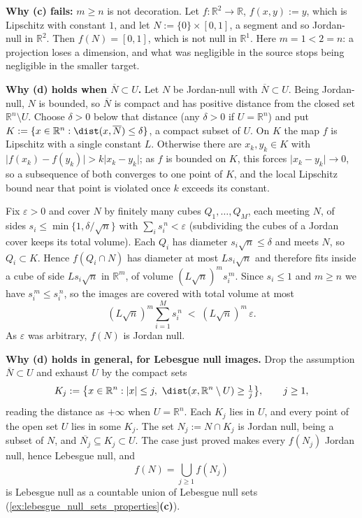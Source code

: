 \begin{exercisesolution}
\textbf{Why (c) fails:} $m \geq n$ is not decoration. Let $f : \mathbb{R}^2 \to \mathbb{R}$,
$f(x,y) := y$, which is Lipschitz with constant $1$, and let
$N := \{0\}\times[0,1]$, a segment and so Jordan-null in $\mathbb{R}^2$. Then $f(N) = [0,1]$,
which is not null in $\mathbb{R}^1$. Here $m = 1 < 2 = n$: a projection loses a dimension, and
what was negligible in the source stops being negligible in the smaller target.

\textbf{Why (d) holds when $\overline N \subset U$.} Let $N$ be Jordan-null with
$\overline N \subset U$. Being Jordan-null, $N$ is bounded, so $\overline N$ is compact and has
positive distance from the closed set $\mathbb{R}^n \setminus U$. Choose $\delta > 0$ below that
distance (any $\delta > 0$ if $U = \mathbb{R}^n$) and put
$K := \{x \in \mathbb{R}^n : \dist(x,\overline N) \leq \delta\}$, a compact subset of $U$. On $K$
the map $f$ is Lipschitz with a single constant $L$. Otherwise there are $x_k, y_k \in K$ with
$\lvert f(x_k) - f(y_k)\rvert > k\lvert x_k - y_k\rvert$; as $f$ is bounded on $K$, this forces
$\lvert x_k - y_k\rvert \to 0$, so a subsequence of both converges to one point of $K$, and the
local Lipschitz bound near that point is violated once $k$ exceeds its constant.

Fix $\varepsilon > 0$ and cover $N$ by finitely many cubes $Q_1,\dots,Q_M$, each meeting $N$, of
sides $s_i \leq \min\{1,\delta/\sqrt n\}$ with $\sum_i s_i^{\,n} < \varepsilon$ (subdividing the
cubes of a Jordan cover keeps its total volume). Each $Q_i$ has diameter
$s_i\sqrt n \leq \delta$ and meets $N$, so $Q_i \subset K$. Hence $f(Q_i \cap N)$ has diameter at
most $L s_i\sqrt n$ and therefore fits inside a cube of side $L s_i \sqrt n$ in $\mathbb{R}^m$, of
volume $(L\sqrt n)^m s_i^{\,m}$. Since $s_i \leq 1$ and $m \geq n$ we have
$s_i^{\,m} \leq s_i^{\,n}$, so the images are covered with total volume at most
\[(L\sqrt n)^m \sum_{i=1}^M s_i^{\,n} \;<\; (L\sqrt n)^m\,\varepsilon.\]
As $\varepsilon$ was arbitrary, $f(N)$ is Jordan null.

\textbf{Why (d) holds in general, for Lebesgue null images.} Drop the assumption
$\overline N \subset U$ and exhaust $U$ by the compact sets
\[K_j := \big\{x \in \mathbb{R}^n : \lvert x\rvert \leq j,\ \dist(x,\mathbb{R}^n\setminus U) \geq
  \tfrac1j\big\}, \qquad j \geq 1,\]
reading the distance as $+\infty$ when $U = \mathbb{R}^n$. Each $K_j$ lies in $U$, and every point
of the open set $U$ lies in some $K_j$. The set $N_j := N \cap K_j$ is Jordan null, being a subset
of $N$, and $\overline{N_j} \subseteq K_j \subset U$. The case just proved makes every $f(N_j)$
Jordan null, hence Lebesgue null, and
\[f(N) = \bigcup_{j\geq1} f(N_j)\]
is Lebesgue null as a countable union of Lebesgue null sets
(\cref{ex:lebesgue_null_sets_properties}\textbf{(c)}).


\end{exercisesolution}

